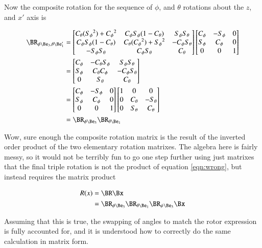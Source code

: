 \documentclass{article}
\begin{document}
Now the composite rotation for the sequence of $\phi$, and $\theta$ rotations about the $z$, and $x'$ axis is

\begin{align*}
\BR_{\phi \Be_3, \theta \Be_1'}
&=
\begin{bmatrix}
C_\theta({S_\phi}^2) + {C_\phi}^2 & {C_\phi} {S_\phi} (1-C_\theta) & {S_\phi} S_\theta \\
{C_\phi} {S_\phi} (1-C_\theta) & C_\theta({C_\phi}^2) + {S_\phi}^2 & - {C_\phi} S_\theta \\
- {S_\phi} S_\theta & {C_\phi} S_\theta & C_\theta \\
\end{bmatrix}
\begin{bmatrix}
C_\phi & - S_\phi & 0 \\
S_\phi & C_\phi & 0 \\
0 & 0 & 1 \\
\end{bmatrix} \\
&=
\begin{bmatrix}
C_\phi & -C_\theta S_\phi & {S_\phi} S_\theta \\
S_\phi & C_\theta C_\phi & - {C_\phi} S_\theta \\
0 & S_\theta & C_\theta \\
\end{bmatrix} \\
&=
\begin{bmatrix}
C_\phi & - S_\phi & 0 \\
S_\phi & C_\phi & 0 \\
0 & 0 & 1 \\
\end{bmatrix}
\begin{bmatrix}
1 & 0 & 0 \\
0 & C_\theta & - S_\theta \\
0 & S_\theta & C_\theta \\
\end{bmatrix} \\
&=
\BR_{\phi \Be_3} 
\BR_{\theta \Be_1} \\
\end{align*}

Wow, sure enough the composite rotation matrix is the result of the inverted order product of the two elementary rotation matrixes.  The
algebra here is fairly messy, so it would not be terribly fun to go one step further using just matrixes that the final triple rotation
is not the product of equation \ref{eqn:wrong}, but instead 
requires
the matrix product

\begin{align}\label{eqn:fixed}
R(x) &= \BR \Bx \\
&= 
\BR_{\phi \Be_3} 
\BR_{\theta \Be_1}
\BR_{\psi \Be_3}
\Bx
\end{align}

Assuming that this is true, the swapping of angles to match the rotor expression is fully accounted for, and it is understood how to
correctly do the same calculation in matrix form.



\end{document}
